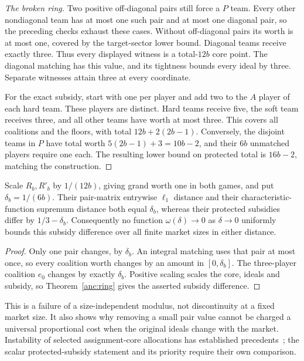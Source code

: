 \begin{proof}[The broken ring]
Two positive off-diagonal pairs still force a $P$ team. Every other
nondiagonal team has at most one such pair and at most one diagonal
pair, so the preceding checks exhaust these cases. Without off-diagonal
pairs its worth is at most one, covered by the target-sector lower
bound. Diagonal teams receive exactly three. Thus every displayed
witness is a total-$12b$ core point. The diagonal matching has this
value, and its tightness bounds every ideal by three. Separate witnesses
attain three at every coordinate.

For the exact subsidy, start with one per player and add two to the
$A$ player of each hard team. These players are distinct. Hard teams
receive five, the soft team receives three, and all other teams have
worth at most three. This covers all coalitions and the floors, with
total $12b+2(2b-1)$. Conversely, the disjoint teams in $P$ have total
worth $5(2b-1)+3=10b-2$, and their $6b$ unmatched players require one
each. The resulting lower bound on protected total is $16b-2$, matching
the construction.
\end{proof}

\begin{corollary}\label{anc:modulus}
Scale $R_b,R'_b$ by $1/(12b)$, giving grand worth one in both games,
and put $\delta_b=1/(6b)$. Their pair-matrix entrywise $\ell_1$
distance and their characteristic-function supremum distance both equal
$\delta_b$, whereas their protected subsidies differ by
$1/3-\delta_b$. Consequently no function $\omega(\delta)\to0$ as
$\delta\to0$ uniformly bounds this subsidy difference over all finite
market sizes in either distance.
\end{corollary}
\begin{proof}
Only one pair changes, by $\delta_b$. An integral matching uses that
pair at most once, so every coalition worth changes by an amount in
$[0,\delta_b]$. The three-player coalition $e_0$ changes by exactly
$\delta_b$. Positive scaling scales the core, ideals and subsidy,
so Theorem~\ref{anc:ring} gives the asserted subsidy difference.
\end{proof}
This is a failure of a size-independent modulus, not discontinuity at a
fixed market size. It also shows why removing a small pair value cannot
be charged a universal proportional cost when the original ideals change
with the market. Instability of selected assignment-core allocations
has established precedents~\cite[Example~3]{anc:KumabeYoshida2024}; the
scalar protected-subsidy statement and its priority require their own
comparison.


